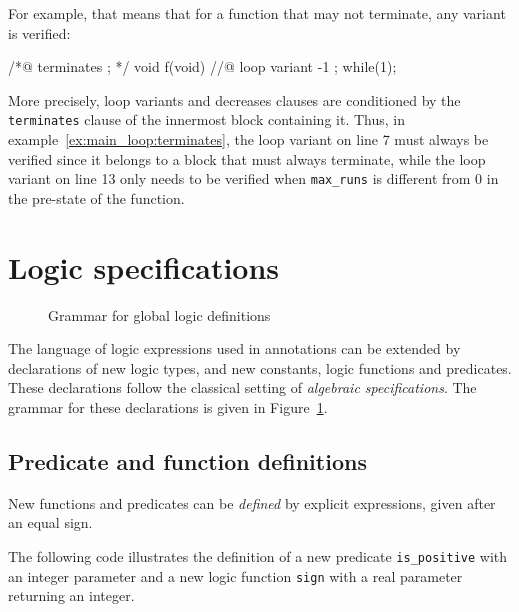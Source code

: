 For example, that means that for a function that may not terminate, any variant
is verified:

\begin{listing}{1}
/*@ terminates \false; */
void f(void) {
  //@ loop variant -1 ;
  while(1);
}
\end{listing}

More precisely, loop variants and decreases clauses are conditioned by the
\lstinline+terminates+ clause of the innermost block containing it. Thus, in
example~\ref{ex:main_loop:terminates}, the loop variant on line 7 must always
be verified since it belongs to a block that must always terminate, while the
loop variant on line 13 only needs to be verified when \lstinline{max_runs} is
different from 0 in the pre-state of the function.

\section{Logic specifications}
\label{sec:logicspec}
\begin{figure}[htp]
  \begin{cadre}
  \vfill 
  \vfill\end{cadre}
  \caption{Grammar for global logic definitions}
\label{fig:gram:logic}
\end{figure}
The language of logic expressions used in annotations can be extended
by declarations of new logic types, and new constants, logic functions
and predicates. These declarations follow the classical setting of
\emph{algebraic specifications}.
The grammar for these declarations is given in Figure~\ref{fig:gram:logic}.

\subsection{Predicate and function definitions}
New functions and predicates can be \emph{defined} by explicit
expressions, given after an equal sign.
\begin{example}
  The following code  illustrates the
  definition of a new predicate \lstinline{is_positive} with an integer
  parameter and a new logic function \lstinline{sign} with a real
  parameter returning an integer.
\end{example}


